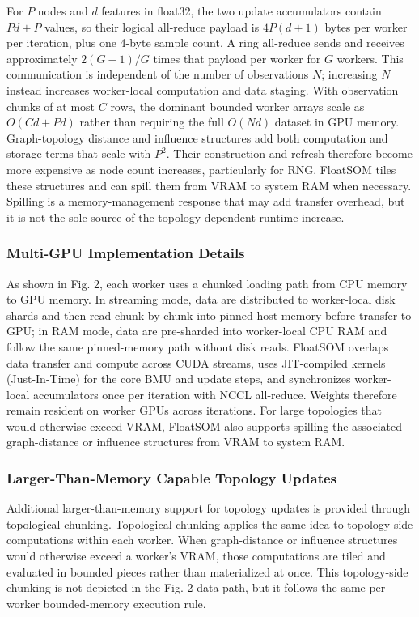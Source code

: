 \documentclass[10pt]{article} %
\begin{document}
For $P$ nodes and $d$ features in float32, the two update accumulators contain $P d+P$ values, so their logical all-reduce payload is $4P(d+1)$ bytes per worker per iteration, plus one 4-byte sample count. A ring all-reduce sends and receives approximately $2(G-1)/G$ times that payload per worker for $G$ workers. This communication is independent of the number of observations $N$; increasing $N$ instead increases worker-local computation and data staging. With observation chunks of at most $C$ rows, the dominant bounded worker arrays scale as $O(Cd+Pd)$ rather than requiring the full $O(Nd)$ dataset in GPU memory. Graph-topology distance and influence structures add both computation and storage terms that scale with $P^2$. Their construction and refresh therefore become more expensive as node count increases, particularly for RNG. FloatSOM tiles these structures and can spill them from VRAM to system RAM when necessary. Spilling is a memory-management response that may add transfer overhead, but it is not the sole source of the topology-dependent runtime increase.

\subsubsection{Multi-GPU Implementation Details}

As shown in Fig. 2, each worker uses a chunked loading path from CPU memory to GPU memory. In streaming mode, data are distributed to worker-local disk shards and then read chunk-by-chunk into pinned host memory before transfer to GPU; in RAM mode, data are pre-sharded into worker-local CPU RAM and follow the same pinned-memory path without disk reads. FloatSOM overlaps data transfer and compute across CUDA streams, uses JIT-compiled kernels (Just-In-Time) for the core BMU and update steps, and synchronizes worker-local accumulators once per iteration with NCCL all-reduce. Weights therefore remain resident on worker GPUs across iterations. For large topologies that would otherwise exceed VRAM, FloatSOM also supports spilling the associated graph-distance or influence structures from VRAM to system RAM.

\subsubsection{Larger-Than-Memory Capable Topology Updates}

Additional larger-than-memory support for topology updates is provided through topological chunking. Topological chunking applies the same idea to topology-side computations within each worker. When graph-distance or influence structures would otherwise exceed a worker's VRAM, those computations are tiled and evaluated in bounded pieces rather than materialized at once. This topology-side chunking is not depicted in the Fig. 2 data path, but it follows the same per-worker bounded-memory execution rule.
\end{document}
